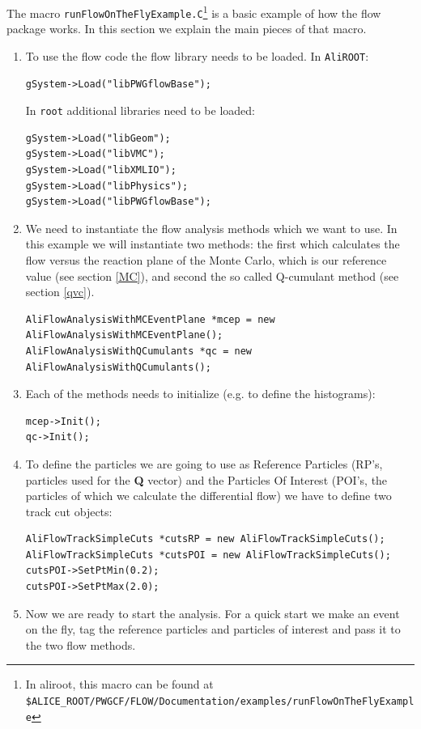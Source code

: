 \documentclass[a4paper]{book}
\numberwithin{equation}{subsection}
\begin{document}
The macro \texttt{runFlowOnTheFlyExample.C}\footnote{In aliroot, this macro can be found at \\ \texttt{\$ALICE\_ROOT/PWGCF/FLOW/Documentation/examples/runFlowOnTheFlyExample}} is a basic example of how the flow package works. 
In this section we explain the main pieces of that macro.
\begin{enumerate}
	\item To use the flow code the flow library needs to be loaded. In \texttt{AliROOT}:
	\begin{lstlisting}
gSystem->Load("libPWGflowBase");\end{lstlisting}
	In \texttt{root} additional libraries need to be loaded: 
	\begin{lstlisting}
gSystem->Load("libGeom");
gSystem->Load("libVMC");
gSystem->Load("libXMLIO");
gSystem->Load("libPhysics");
gSystem->Load("libPWGflowBase");\end{lstlisting}
	\item We need to instantiate the flow analysis methods which we want to use. In this example we will
	instantiate two methods: the first which calculates the flow versus the reaction plane of the Monte Carlo, which is our reference value (see section \ref{MC}), and second the so called Q-cumulant method (see section \ref{qvc}).
	\begin{lstlisting}
AliFlowAnalysisWithMCEventPlane *mcep = new AliFlowAnalysisWithMCEventPlane();
AliFlowAnalysisWithQCumulants *qc = new AliFlowAnalysisWithQCumulants();\end{lstlisting}
	\item Each of the methods needs to initialize (e.g. to define the histograms): 
	\begin{lstlisting}
mcep->Init(); 
qc->Init();\end{lstlisting}
	\item To define the particles we are going to use as Reference Particles  (RP's, particles 
	used for the {\bf Q} vector) and the Particles Of Interest  (POI's, the particles of which 
	we calculate the differential flow) we have to define two track cut objects:
	\begin{lstlisting}
AliFlowTrackSimpleCuts *cutsRP = new AliFlowTrackSimpleCuts();
AliFlowTrackSimpleCuts *cutsPOI = new AliFlowTrackSimpleCuts();
cutsPOI->SetPtMin(0.2);
cutsPOI->SetPtMax(2.0);	\end{lstlisting}
	\item Now we are ready to start the analysis. For a quick start we make an event on the fly, tag the reference particles and particles of interest  and pass it to the two flow methods. 
	

\end{enumerate}
\end{document}

